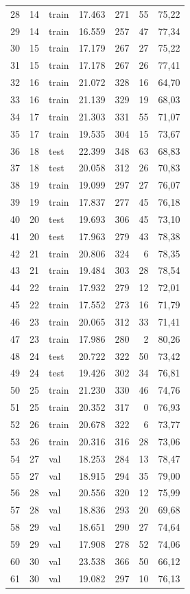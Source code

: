 \begin{longtable}{@{}rrlrrrr@{}}
28 & 14 & train & 17.463 & 271 & 55 & 75,22 \\
29 & 14 & train & 16.559 & 257 & 47 & 77,34 \\
30 & 15 & train & 17.179 & 267 & 27 & 75,22 \\
31 & 15 & train & 17.178 & 267 & 26 & 77,41 \\
32 & 16 & train & 21.072 & 328 & 16 & 64,70 \\
33 & 16 & train & 21.139 & 329 & 19 & 68,03 \\
34 & 17 & train & 21.303 & 331 & 55 & 71,07 \\
35 & 17 & train & 19.535 & 304 & 15 & 73,67 \\
36 & 18 & test & 22.399 & 348 & 63 & 68,83 \\
37 & 18 & test & 20.058 & 312 & 26 & 70,83 \\
38 & 19 & train & 19.099 & 297 & 27 & 76,07 \\
39 & 19 & train & 17.837 & 277 & 45 & 76,18 \\
40 & 20 & test & 19.693 & 306 & 45 & 73,10 \\
41 & 20 & test & 17.963 & 279 & 43 & 78,38 \\
42 & 21 & train & 20.806 & 324 & 6 & 78,35 \\
43 & 21 & train & 19.484 & 303 & 28 & 78,54 \\
44 & 22 & train & 17.932 & 279 & 12 & 72,01 \\
45 & 22 & train & 17.552 & 273 & 16 & 71,79 \\
46 & 23 & train & 20.065 & 312 & 33 & 71,41 \\
47 & 23 & train & 17.986 & 280 & 2 & 80,26 \\
48 & 24 & test & 20.722 & 322 & 50 & 73,42 \\
49 & 24 & test & 19.426 & 302 & 34 & 76,81 \\
50 & 25 & train & 21.230 & 330 & 46 & 74,76 \\
51 & 25 & train & 20.352 & 317 & 0 & 76,93 \\
52 & 26 & train & 20.678 & 322 & 6 & 73,77 \\
53 & 26 & train & 20.316 & 316 & 28 & 73,06 \\
54 & 27 & val & 18.253 & 284 & 13 & 78,47 \\
55 & 27 & val & 18.915 & 294 & 35 & 79,00 \\
56 & 28 & val & 20.556 & 320 & 12 & 75,99 \\
57 & 28 & val & 18.836 & 293 & 20 & 69,68 \\
58 & 29 & val & 18.651 & 290 & 27 & 74,64 \\
59 & 29 & val & 17.908 & 278 & 52 & 74,06 \\
60 & 30 & val & 23.538 & 366 & 50 & 66,12 \\
61 & 30 & val & 19.082 & 297 & 10 & 76,13 \\
\bottomrule\end{longtable}
